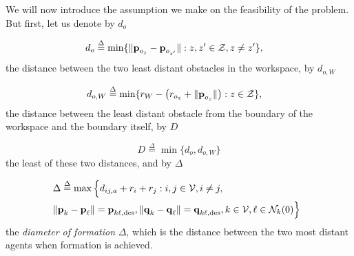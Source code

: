We will now introduce the assumption we make on the feasibility of the
problem. But first, let us denote by $d_o$

\begin{align*}
  d_o &\overset{\Delta}{=} \min\{\| \bm{\mathbf{p}}_{o_z} - \bm{\mathbf{p}}_{o_{z'}}\| : z,z' \in \mathcal{Z}, z \neq z' \},
\end{align*}
the distance between the two least distant obstacles in the workspace,
by $d_{o,W}$

\begin{align*}
  d_{o,W} &\overset{\Delta}{=} \min\{r_W - \left( r_{o_z} + \| \bm{\mathbf{p}}_{o_z} \| \right) : z \in \mathcal{Z}\},
\end{align*}
the distance between the least distant obstacle from the boundary of the
workspace and the boundary itself, by $D$

\begin{equation*}
  D \overset{\Delta}{=} \min\{d_o, d_{o,W}\}
\end{equation*}
the least of these two distances, and by $\Delta$

\begin{align*}
  &\hspace{-2mm} \Delta \overset{\Delta}{=}  \max\Big\{d_{ij, a}+r_i+r_j: i, j \in \mathcal{V}, i \neq j, \notag \\
  &\hspace{-2mm} \| \vect{p}_k - \vect{p}_\ell \| = \vect{p}_{k \ell,\text{des}},
  \|\vect{q}_k - \vect{q}_\ell\| = \vect{q}_{k \ell,\text{des}},
  k \in \mathcal{V},
  \ell \in \mathcal{N}_k(0)\Big\}
\end{align*}
the \emph{diameter of formation} $\Delta$, which is the
distance between the two most distant agents when formation is achieved.

